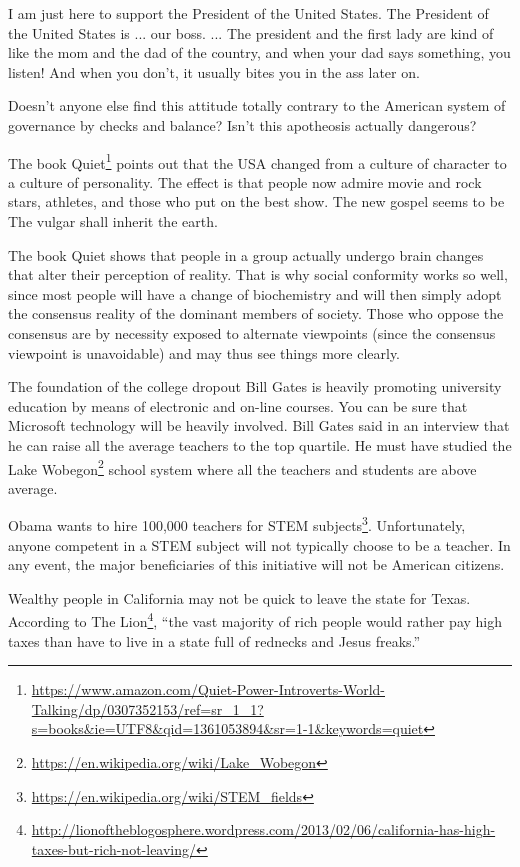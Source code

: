 \begin{quotex}
I am just here to support the President of the United States. The President of the United States is ... our boss. ... The president and the first lady are kind of like the mom and the dad of the country, and when your dad says something, you listen! And when you don't, it usually bites you in the ass later on.
\end{quotex}


Doesn't anyone else find this attitude totally contrary to the American system of governance by checks and balance? Isn't this apotheosis actually dangerous?

The book Quiet\footnote{\url{https://www.amazon.com/Quiet-Power-Introverts-World-Talking/dp/0307352153/ref=sr\_1\_1?s=books&ie=UTF8&qid=1361053894&sr=1-1&keywords=quiet}} points out that the USA changed from a culture of character to a culture of personality. The effect is that people now admire movie and rock stars, athletes, and those who put on the best show. The new gospel seems to be The vulgar shall inherit the earth.

The book Quiet shows that people in a group actually undergo brain changes that alter their perception of reality. That is why social conformity works so well, since most people will have a change of biochemistry and will then simply adopt the consensus reality of the dominant members of society. Those who oppose the consensus are by necessity exposed to alternate viewpoints (since the consensus viewpoint is unavoidable) and may thus see things more clearly.

The foundation of the college dropout Bill Gates is heavily promoting university education by means of electronic and on-line courses. You can be sure that Microsoft technology will be heavily involved. Bill Gates said in an interview that he can raise all the average teachers to the top quartile. He must have studied the Lake Wobegon\footnote{\url{https://en.wikipedia.org/wiki/Lake\_Wobegon}} school system where all the teachers and students are above average.

Obama wants to hire 100,000 teachers for STEM subjects\footnote{\url{https://en.wikipedia.org/wiki/STEM\_fields}}. Unfortunately, anyone competent in a STEM subject will not typically choose to be a teacher. In any event, the major beneficiaries of this initiative will not be American citizens.

Wealthy people in California may not be quick to leave the state for Texas. According to The Lion\footnote{\url{http://lionoftheblogosphere.wordpress.com/2013/02/06/california-has-high-taxes-but-rich-not-leaving/}}, ``the vast majority of rich people would rather pay high taxes than have to live in a state full of rednecks and Jesus freaks.''

